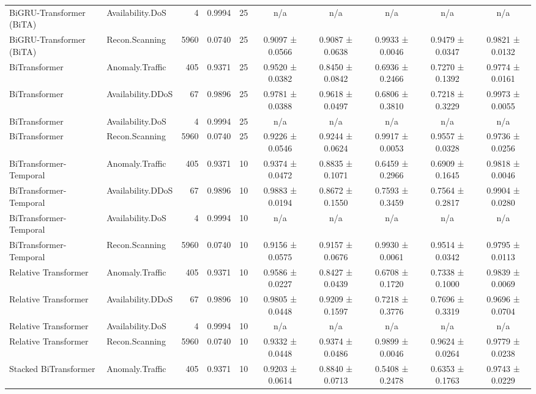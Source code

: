 \begin{tabular}{llrrrccccc}
BiGRU-Transformer (BiTA) & Availability.DoS & 4 & 0.9994 & 25 & n/a & n/a & n/a & n/a & n/a \\
BiGRU-Transformer (BiTA) & Recon.Scanning & 5960 & 0.0740 & 25 & 0.9097 ± 0.0566 & 0.9087 ± 0.0638 & 0.9933 ± 0.0046 & 0.9479 ± 0.0347 & 0.9821 ± 0.0132 \\
BiTransformer & Anomaly.Traffic & 405 & 0.9371 & 25 & 0.9520 ± 0.0382 & 0.8450 ± 0.0842 & 0.6936 ± 0.2466 & 0.7270 ± 0.1392 & 0.9774 ± 0.0161 \\
BiTransformer & Availability.DDoS & 67 & 0.9896 & 25 & 0.9781 ± 0.0388 & 0.9618 ± 0.0497 & 0.6806 ± 0.3810 & 0.7218 ± 0.3229 & 0.9973 ± 0.0055 \\
BiTransformer & Availability.DoS & 4 & 0.9994 & 25 & n/a & n/a & n/a & n/a & n/a \\
BiTransformer & Recon.Scanning & 5960 & 0.0740 & 25 & 0.9226 ± 0.0546 & 0.9244 ± 0.0624 & 0.9917 ± 0.0053 & 0.9557 ± 0.0328 & 0.9736 ± 0.0256 \\
BiTransformer-Temporal & Anomaly.Traffic & 405 & 0.9371 & 10 & 0.9374 ± 0.0472 & 0.8835 ± 0.1071 & 0.6459 ± 0.2966 & 0.6909 ± 0.1645 & 0.9818 ± 0.0046 \\
BiTransformer-Temporal & Availability.DDoS & 67 & 0.9896 & 10 & 0.9883 ± 0.0194 & 0.8672 ± 0.1550 & 0.7593 ± 0.3459 & 0.7564 ± 0.2817 & 0.9904 ± 0.0280 \\
BiTransformer-Temporal & Availability.DoS & 4 & 0.9994 & 10 & n/a & n/a & n/a & n/a & n/a \\
BiTransformer-Temporal & Recon.Scanning & 5960 & 0.0740 & 10 & 0.9156 ± 0.0575 & 0.9157 ± 0.0676 & 0.9930 ± 0.0061 & 0.9514 ± 0.0342 & 0.9795 ± 0.0113 \\
Relative Transformer & Anomaly.Traffic & 405 & 0.9371 & 10 & 0.9586 ± 0.0227 & 0.8427 ± 0.0439 & 0.6708 ± 0.1720 & 0.7338 ± 0.1000 & 0.9839 ± 0.0069 \\
Relative Transformer & Availability.DDoS & 67 & 0.9896 & 10 & 0.9805 ± 0.0448 & 0.9209 ± 0.1597 & 0.7218 ± 0.3776 & 0.7696 ± 0.3319 & 0.9696 ± 0.0704 \\
Relative Transformer & Availability.DoS & 4 & 0.9994 & 10 & n/a & n/a & n/a & n/a & n/a \\
Relative Transformer & Recon.Scanning & 5960 & 0.0740 & 10 & 0.9332 ± 0.0448 & 0.9374 ± 0.0486 & 0.9899 ± 0.0046 & 0.9624 ± 0.0264 & 0.9779 ± 0.0238 \\
Stacked BiTransformer & Anomaly.Traffic & 405 & 0.9371 & 10 & 0.9203 ± 0.0614 & 0.8840 ± 0.0713 & 0.5408 ± 0.2478 & 0.6353 ± 0.1763 & 0.9743 ± 0.0229 \\

\end{tabular}
